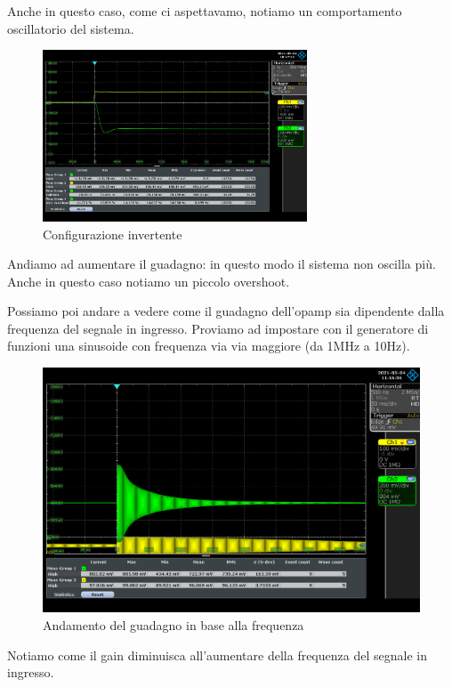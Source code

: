 Anche in questo caso, come ci aspettavamo, notiamo un comportamento oscillatorio del sistema.

\begin{figure}[H]
\centering
\includegraphics[width=0.7\textwidth]{assets/exp8/invertente.png}
\caption{Configurazione invertente}
\end{figure}

Andiamo ad aumentare il guadagno: in questo modo il sistema non oscilla più. Anche in questo caso notiamo un piccolo overshoot.

Possiamo poi andare a vedere come il guadagno dell'opamp sia dipendente dalla frequenza del segnale in ingresso.
Proviamo ad impostare con il generatore di funzioni una sinusoide con frequenza via via maggiore (da 1MHz a 10Hz).

\begin{figure}[H]
\centering
\includegraphics[width=\textwidth]{assets/exp8/Screenshot_2021-05-04_1_111636.png}
\caption{Andamento del guadagno in base alla frequenza}
\end{figure}
Notiamo come il gain diminuisca all'aumentare della frequenza del segnale in ingresso.

